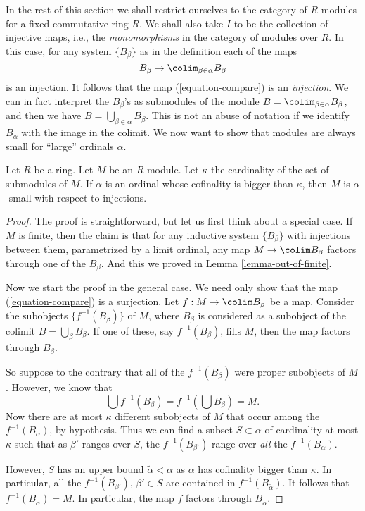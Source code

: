 \noindent
In the rest of this section we shall restrict ourselves
to the category of $R$-modules for a fixed commutative ring $R$.
We shall also take $I$ to be the collection of injective maps, i.e., the
{\it monomorphisms} in the category of modules over $R$. In this case, for
any system $\{B_\beta\}$ as in the definition each of the maps
$$
B_\beta \to \colim_{\beta \in \alpha} B_\beta
$$
is an injection. It follows that the map (\ref{equation-compare}) is an
{\it injection}. We can in fact interpret the $B_\beta$'s as submodules
of the module $B = \colim_{\beta \in \alpha} B_\beta$, and then we
have $B = \bigcup_{\beta \in \alpha} B_\beta$. This is not an abuse of
notation if we identify $B_\alpha$ with the image in the colimit.
We now want to show that modules are always small for ``large'' ordinals
$\alpha$.

\begin{proposition}
\label{proposition-modules-are-small}
Let $R$ be a ring. Let $M$ be an $R$-module.
Let $\kappa$ the cardinality of the set of submodules of $M$.
If $\alpha$ is an ordinal whose cofinality is bigger than $\kappa$,
then $M$ is $\alpha$-small with respect to injections.
\end{proposition}

\begin{proof}
The proof is straightforward, but let us first think about a special case.
If $M$ is finite, then the claim is that for any inductive system
$\{B_\beta\}$ with injections between them, parametrized by a
limit ordinal, any map $M \to \colim B_\beta$ factors through one of
the $B_\beta$. And this we proved in
Lemma \ref{lemma-out-of-finite}.

\medskip\noindent
Now we start the proof in the general case.
We need only show that the map (\ref{equation-compare}) is a surjection.
Let $f : M \to \colim B_\beta$ be a map.
Consider the subobjects $\{f^{-1}(B_\beta)\}$ of $M$, where $B_\beta$
is considered as a subobject of the colimit $B = \bigcup_\beta B_\beta$.
If one of these, say $f^{-1}(B_\beta)$, fills $M$,
then the map factors through $B_\beta$.

\medskip\noindent
So suppose to the contrary that all of the $f^{-1}(B_\beta)$ were proper
subobjects of $M$. However, we know that
$$
\bigcup f^{-1}(B_\beta) = f^{-1}\left(\bigcup B_\beta\right) = M.
$$
Now there are at most $\kappa$ different subobjects of $M$ that occur among
the $f^{-1}(B_\alpha)$, by hypothesis.
Thus we can find a subset $S \subset \alpha$ of cardinality at most
$\kappa$ such that as $\beta'$ ranges over $S$, the
$f^{-1}(B_{\beta'})$ range over \emph{all} the $f^{-1}(B_\alpha)$.

\medskip\noindent
However, $S$ has an upper bound $\widetilde{\alpha} < \alpha$ as
$\alpha$ has cofinality bigger than $\kappa$. In particular, all the
$f^{-1}(B_{\beta'})$, $\beta' \in S$ are contained in
$f^{-1}(B_{\widetilde{\alpha}})$.
It follows that $f^{-1}(B_{\widetilde{\alpha}}) = M$.
In particular, the map $f$ factors through $B_{\widetilde{\alpha}}$.
\end{proof}

